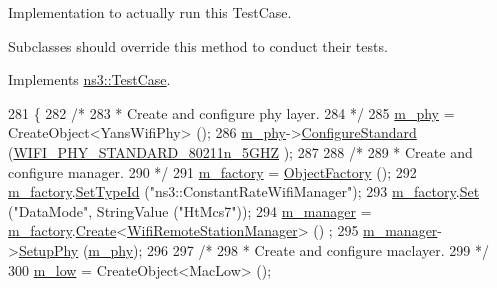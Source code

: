 Implementation to actually run this Test\+Case. 

Subclasses should override this method to conduct their tests. 

Implements \hyperlink{classns3_1_1TestCase_a8ff74680cf017ed42011e4be51917a24}{ns3\+::\+Test\+Case}.


\begin{DoxyCode}
281 \{
282   \textcolor{comment}{/*}
283 \textcolor{comment}{   * Create and configure phy layer.}
284 \textcolor{comment}{   */}
285   \hyperlink{classTwoLevelAggregationTest_a2e90603b55371a04829447a4341340b7}{m\_phy} = CreateObject<YansWifiPhy> ();
286   \hyperlink{classTwoLevelAggregationTest_a2e90603b55371a04829447a4341340b7}{m\_phy}->\hyperlink{classns3_1_1WifiPhy_aeafbea9bd8c1ae20f85584f55d868d23}{ConfigureStandard} (\hyperlink{group__wifi_gga1299834f4e1c615af3ca738033b76a49aaabe94a0be4668583c42595437b4a6c0}{WIFI\_PHY\_STANDARD\_80211n\_5GHZ}
      );
287 
288   \textcolor{comment}{/*}
289 \textcolor{comment}{   * Create and configure manager.}
290 \textcolor{comment}{   */}
291   \hyperlink{classTwoLevelAggregationTest_a5b0df48a92f6160fbdf46911f2dc6e26}{m\_factory} = \hyperlink{classns3_1_1ObjectFactory}{ObjectFactory} ();
292   \hyperlink{classTwoLevelAggregationTest_a5b0df48a92f6160fbdf46911f2dc6e26}{m\_factory}.\hyperlink{classns3_1_1ObjectFactory_a77dcd099064038a1eb7a6b8251229ec3}{SetTypeId} (\textcolor{stringliteral}{"ns3::ConstantRateWifiManager"});
293   \hyperlink{classTwoLevelAggregationTest_a5b0df48a92f6160fbdf46911f2dc6e26}{m\_factory}.\hyperlink{classns3_1_1ObjectFactory_aef5c0d5019c96bdf01cefd1ff83f4a68}{Set} (\textcolor{stringliteral}{"DataMode"}, StringValue (\textcolor{stringliteral}{"HtMcs7"}));
294   \hyperlink{classTwoLevelAggregationTest_a118997e06775ec177507bbf2dec94e2c}{m\_manager} = \hyperlink{classTwoLevelAggregationTest_a5b0df48a92f6160fbdf46911f2dc6e26}{m\_factory}.\hyperlink{classns3_1_1ObjectFactory_a18152e93f0a6fe184ed7300cb31e9896}{Create}<\hyperlink{classns3_1_1WifiRemoteStationManager}{WifiRemoteStationManager}> ()
      ;
295   \hyperlink{classTwoLevelAggregationTest_a118997e06775ec177507bbf2dec94e2c}{m\_manager}->\hyperlink{classns3_1_1WifiRemoteStationManager_a823deffface82c9fe1daa06ce11c585b}{SetupPhy} (\hyperlink{classTwoLevelAggregationTest_a2e90603b55371a04829447a4341340b7}{m\_phy});
296 
297   \textcolor{comment}{/*}
298 \textcolor{comment}{   * Create and configure maclayer.}
299 \textcolor{comment}{   */}
300   \hyperlink{classTwoLevelAggregationTest_a408234bde940ec7a7a61112d512f7a63}{m\_low} = CreateObject<MacLow> ();

\end{DoxyCode}

